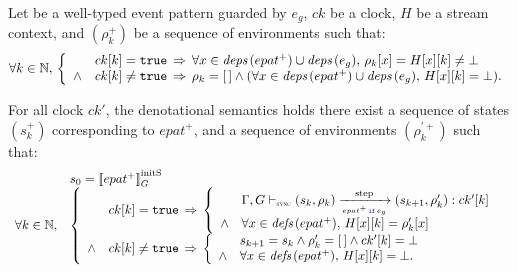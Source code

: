 \begin{lemma}
    \label{lem:semantics:grsync:theorems:equivalence:epat}
    Let  be a well-typed \GRSync event pattern guarded by $e_g$, $ck$ be a
    clock, $H$ be a stream context, and $(\rho_k^+)$ be a sequence of environments such that:
    \begin{equation*}
        \forall k \in \mathbb{N}, \,
        \left\{
        \begin{array}{ll}
                   & ck[k] = \mathtt{{true}} \, \Rightarrow \,  \forall x \in {\ensuremath{\textit{deps}\left(epat^+\right)}} \cup {\ensuremath{\textit{deps}\left(e_g\right)}}, \,
            \rho_k[x] = H[x][k] \neq \bot                                                             \\
            \wedge & ck[k] \neq \mathtt{{true}} \, \Rightarrow \,  \rho_k = [\,] \wedge (\forall
            x \in {\ensuremath{\textit{deps}\left(epat^+\right)}} \cup {\ensuremath{\textit{deps}\left(e_g\right)}}, \, H[x][k] = \bot).                                  \\
        \end{array}
        \right.
    \end{equation*}

    For all clock $ck'$, the denotational semantics 
    holds \iff there exist a sequence of states $(s_k^+)$ corresponding to $epat^+$, and a sequence
    of environments $(\rho_k^{\prime+})$ such that:
    \begin{equation*}
        \begin{array}{ll}
                              & s_0 = \initstate{epat^+} \\
            \forall k \in \N, &
            \left\{
            \begin{array}{ll}
                       & ck[k] = \true \, \Rightarrow \,
                \left\{
                \begin{array}{ll}
                           & \epatOpsem{\rho_k}{s_k}{\guarded{epat^+}{e_g}}{s_{k+1}}{ck'[k]}{\rho'_k} \\
                    \wedge & \forall x \in \defs{epat^+}, \, H[x][k] = \rho'_k[x]                     \\
                \end{array}
                \right.                                     \\
                \wedge & ck[k] \neq \true \, \Rightarrow \,
                \left\{
                \begin{array}{ll}
                           & s_{k+1} = s_k \wedge \rho'_k = \emptyrho \wedge ck'[k] = \bot \\
                    \wedge & \forall x \in \defs{epat^+}, \, H[x][k] = \bot.               \\
                \end{array}
                \right.                                     \\
            \end{array}
            \right.
        \end{array}
    \end{equation*}
\end{lemma}
